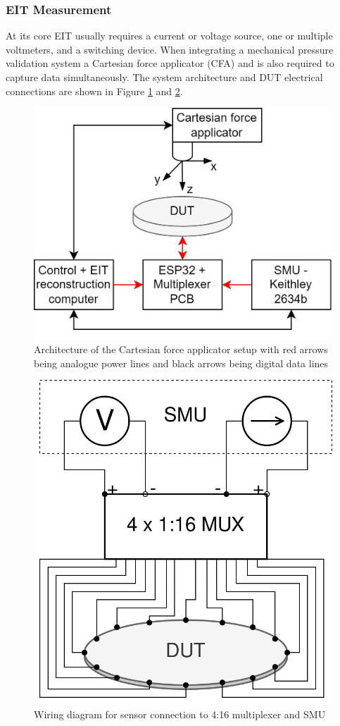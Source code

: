 \subsubsection{EIT Measurement}\label{sec:EIT Measurement}
At its core EIT usually requires a current or voltage source, one or multiple voltmeters, and a switching device. When integrating a mechanical pressure validation system a Cartesian force applicator (CFA) and is also required to capture data simultaneously. The system architecture and DUT electrical connections are shown in Figure \ref{fig:eit_sensor_architecture} and \ref{fig:wiring_ERT_sensor}. 
\begin{figure}[H]
    \centering
    \includegraphics[width=0.6\linewidth]{Figures/ERT_MUX_CFA_architecture.jpg}
    \caption{Architecture of the Cartesian force applicator setup with red arrows being analogue power lines and black arrows being digital data lines}
    \label{fig:eit_sensor_architecture}
\end{figure}
\begin{figure}[H]
    \centering
    \includegraphics[width=0.35\linewidth]{Figures/wiring_diagram_ERT_sensor.jpg}
    \caption{Wiring diagram for sensor connection to 4:16 multiplexer and SMU}
    \label{fig:wiring_ERT_sensor}
\end{figure} 


